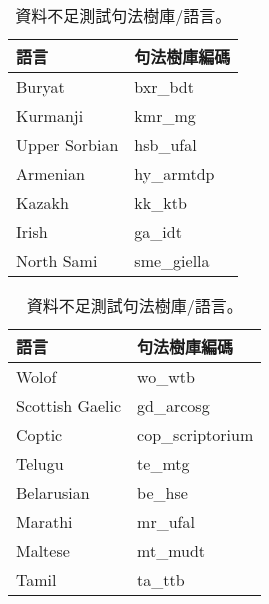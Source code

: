 \begin{table}[h!]
\centering
\begin{subtable}[t]{.5\textwidth}
    \centering
    \begin{tabular}[t]{|l l|}
        \hline
        \textbf{語言} & \textbf{句法樹庫編碼} \\
        \hline
        Buryat & bxr\_bdt \\
        Kurmanji & kmr\_mg \\
        Upper Sorbian & hsb\_ufal \\
        Armenian & hy\_armtdp \\
        Kazakh & kk\_ktb \\
        Irish & ga\_idt \\
        North Sami & sme\_giella \\
        \hline
    \end{tabular}
    \caption{真實資料不足測試句法樹庫/語言。}
    \label{tab:true_lr_testing_languages}
\end{subtable}%
\begin{subtable}[t]{.5\textwidth}
    \centering
    \begin{tabular}[t]{|l l|}
        \hline
        \textbf{語言} & \textbf{句法樹庫編碼} \\
        \hline
        Wolof & wo\_wtb \\
        Scottish Gaelic & gd\_arcosg \\
        Coptic & cop\_scriptorium \\
        Telugu & te\_mtg \\
        Belarusian & be\_hse \\
        Marathi & mr\_ufal \\
        Maltese & mt\_mudt \\
        Tamil & ta\_ttb \\
        \hline
    \end{tabular}
    \caption{模擬資料不足測試句法樹庫/語言。}
    \label{tab:sim_lr_testing_languages}
\end{subtable}%
\caption{資料不足測試句法樹庫/語言。}
\end{table}